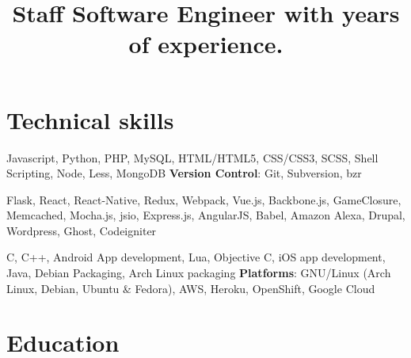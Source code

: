 \documentclass[11pt,a4paper]{moderncv}
\title{Staff Software Engineer with \YExperience \Plus { } years of experience.}
\begin{document}
\maketitle

\section{Technical skills}
           {Javascript, Python, PHP, MySQL, HTML/HTML5, CSS/CSS3, SCSS, Shell Scripting, Node, Less, MongoDB}
           {\textbf{Version Control}: }
           {Git, Subversion, bzr}

           {Flask, React, React-Native, Redux, Webpack, Vue.js, Backbone.js, GameClosure, Memcached, Mocha.js, jsio, Express.js, AngularJS, Babel, Amazon Alexa, Drupal, Wordpress, Ghost, Codeigniter}

           {C, C++, Android App development, Lua, Objective C, iOS app development, Java, Debian Packaging, Arch Linux packaging}
           {\textbf{Platforms}: }
           {GNU/Linux (Arch Linux, Debian, Ubuntu \& Fedora), AWS, Heroku, OpenShift, Google Cloud}

\section{Education}

\pagebreak
\end{document}
